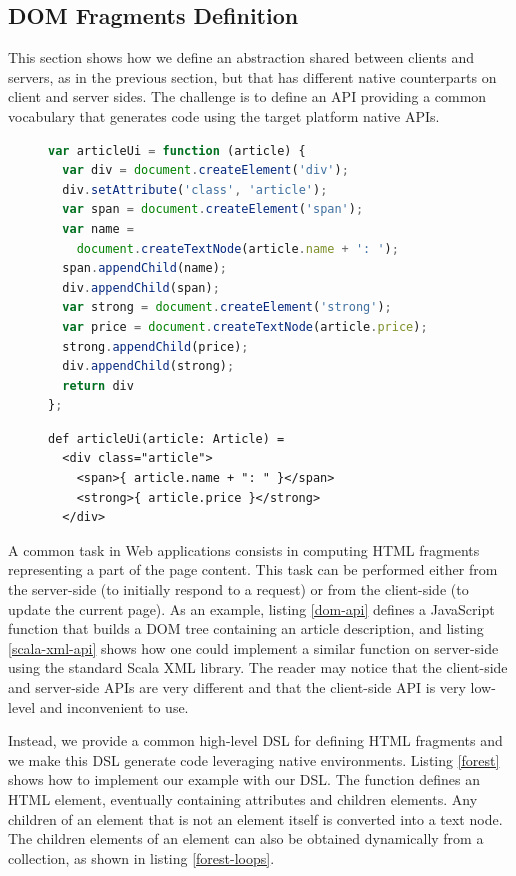 \documentclass[preprint]{sigplanconf}
\begin{document}
\subsection{DOM Fragments Definition}

This section shows how we define an abstraction shared between clients and servers, as in the
previous section, but that has different native counterparts on client and server sides. The
challenge is to define an API providing a common vocabulary that generates code using the target
platform native APIs.

\begin{figure}
\begin{lstlisting}[language=JavaScript,caption=JavaScript DOM API,label=dom-api]
var articleUi = function (article) {
  var div = document.createElement('div');
  div.setAttribute('class', 'article');
  var span = document.createElement('span');
  var name =
    document.createTextNode(article.name + ': ');
  span.appendChild(name);
  div.appendChild(span);
  var strong = document.createElement('strong');
  var price = document.createTextNode(article.price);
  strong.appendChild(price);
  div.appendChild(strong);
  return div
};
\end{lstlisting}
\end{figure}

\begin{figure}
\begin{lstlisting}[caption=Scala XML API,label=scala-xml-api]
def articleUi(article: Article) =
  <div class="article">
    <span>{ article.name + ": " }</span>
    <strong>{ article.price }</strong>
  </div>
\end{lstlisting}
\end{figure}

A common task in Web applications consists in computing HTML fragments representing a part of the
page content. This task can be performed either from the server-side (to initially respond to a
request) or from the client-side (to update the current page). As an example, listing \ref{dom-api}
defines a JavaScript function  that builds a DOM tree containing an article
description, and listing \ref{scala-xml-api} shows how one could implement a similar function on
server-side using the standard Scala XML library. The reader may notice that the client-side
and server-side APIs are very different and that the client-side API is very low-level and
inconvenient to use.

Instead, we provide a common high-level DSL for defining HTML fragments and we make this DSL
generate code leveraging native environments. Listing \ref{forest} shows how to implement our
example with our DSL. The  function defines an HTML element, eventually containing
attributes and children elements. Any children of an element that is not an element itself is
converted into a text node. The children elements of an element can also be obtained
dynamically from a collection, as shown in listing \ref{forest-loops}.
\end{document}
